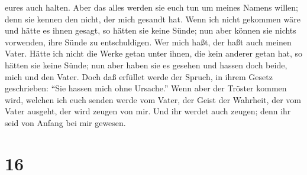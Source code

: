 eures auch halten.  Aber das alles werden sie euch tun um
meines Namens willen; denn sie kennen den nicht, der mich gesandt hat.
 Wenn ich nicht gekommen wäre und hätte es ihnen gesagt, so
hätten sie keine Sünde; nun aber können sie nichts vorwenden, ihre Sünde
zu entschuldigen.  Wer mich haßt, der haßt auch meinen
Vater.  Hätte ich nicht die Werke getan unter ihnen, die
kein anderer getan hat, so hätten sie keine Sünde; nun aber haben sie es
gesehen und hassen doch beide, mich und den Vater.  Doch
daß erfüllet werde der Spruch, in ihrem Gesetz geschrieben: ``Sie hassen
mich ohne Ursache.''  Wenn aber der Tröster kommen wird,
welchen ich euch senden werde vom Vater, der Geist der Wahrheit, der vom
Vater ausgeht, der wird zeugen von mir.  Und ihr werdet
auch zeugen; denn ihr seid von Anfang bei mir gewesen.

\hypertarget{section-15}{%
\section{16}\label{section-15}}

